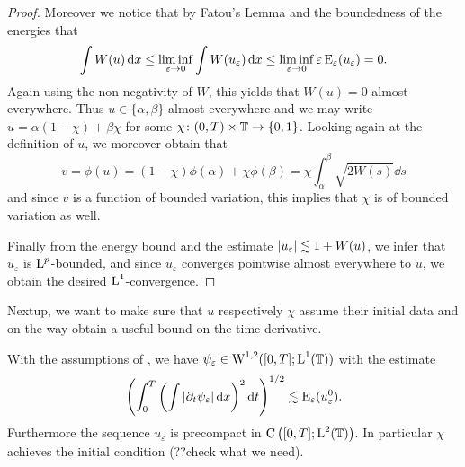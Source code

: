 \begin{proof}
	Moreover we notice that by Fatou's Lemma and the boundedness of the energies that
	\begin{equation*}
		\int
			W ( u ) 
		\dd{ x }
		\leq
		\liminf_{ \varepsilon \to 0 }
			\int
				W ( u_{ \varepsilon } )
			\dd{ x }
		\leq
		\liminf_{ \varepsilon \to 0 }
			\varepsilon \operatorname{E}_{ \varepsilon } ( u_{ \varepsilon } )
		=
		0.
	\end{equation*}
	Again using the non-negativity of $ W $, this yields that $ W ( u ) = 0 $ almost everywhere. 
	Thus $ u \in \{ \alpha , \beta \} $ almost everywhere and we may write $ u = \alpha ( 1 - \chi ) + \beta \chi $ for some $ \chi \colon ( 0 , T ) \times \operatorname{\mathbb{T}} \to \{ 0 , 1 \} $.
	Looking again at the definition of $ u $, we moreover obtain that 
	\begin{equation*}
		v = \phi ( u ) = 
		( 1 - \chi ) \phi ( \alpha ) 
		+ 
		\chi \phi ( \beta )
		= 
		\chi \int_{ \alpha }^{ \beta } \sqrt{ 2 W ( s ) } \dd{ s }
	\end{equation*}
	and since $ v $ is a function of bounded variation, this implies that $ \chi $ is of bounded variation as well.
	
	Finally from the energy bound and the estimate $ \abs{ u_{ \varepsilon } } \lesssim 1 + W ( u ) $, we infer that $ u_{ \varepsilon } $ is $ \operatorname{L}^{ p }$-bounded, and since $ u_{ \varepsilon } $ converges pointwise almost everywhere to $ u $, we obtain the desired $ \operatorname{L}^{ 1 } $-convergence.
\end{proof}

Nextup, we want to make sure that $ u $ respectively $ \chi $ assume their initial data and on the way obtain a useful bound on the time derivative.

\begin{lemma}
	With the assumptions of , we have $ \psi_{ \varepsilon } \in \operatorname{W}^{ 1 , 2 } ( [ 0 , T ] ; \operatorname{L}^{ 1 } ( \mathbb{ T } ) ) $ with the estimate
	\begin{equation}
		\label{bound_on_time_dv_of_psi_epsilon}
		\left(
			\int_{ 0 }^{ T }
				\left(
					\int
						\abs{ \partial_{ t } \psi_{ \varepsilon } }
					\dd{ x }
				\right)^{ 2 }
			\dd{ t }
		\right)^{ 1/2 }
		\lesssim
		\operatorname{E}_{ \varepsilon } ( u_{ \varepsilon }^{ 0 } ).
	\end{equation}
	Furthermore the sequence $ u_{ \varepsilon } $ is precompact in $ \operatorname{C} \left( [ 0 , T ] ; \operatorname{L}^{ 2 } ( \operatorname{\mathbb{T}} ) \right) $. In particular $ \chi $ achieves the initial condition (??check what we need).
\end{lemma}

